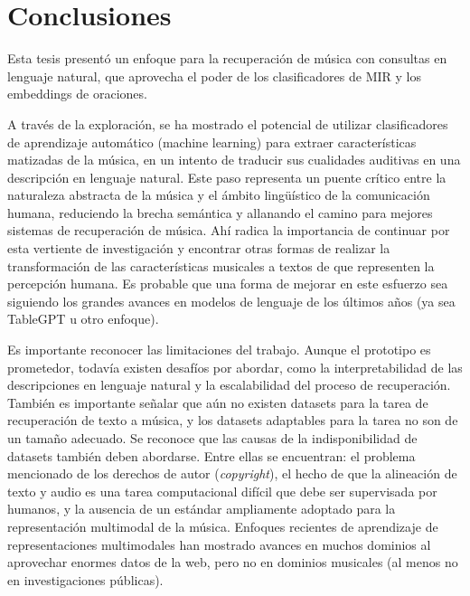 \chapter*{Conclusiones}
\label{chap:conclusions}
Esta tesis presentó un enfoque para la recuperación de música con consultas en lenguaje natural, que aprovecha el poder de los clasificadores de MIR y los embeddings de oraciones.

A través de la exploración, se ha mostrado el potencial de utilizar clasificadores de aprendizaje automático (machine learning) para extraer características matizadas de la música, en un intento de traducir sus cualidades auditivas en una descripción en lenguaje natural. Este paso representa un puente crítico entre la naturaleza abstracta de la música y el ámbito lingüístico de la comunicación humana, reduciendo la brecha semántica y allanando el camino para mejores sistemas de recuperación de música. Ahí radica la importancia de continuar por esta vertiente de investigación y encontrar otras formas de realizar la transformación de las características musicales a textos de que representen la percepción humana. Es probable que una forma de mejorar en este esfuerzo sea siguiendo los grandes avances en modelos de lenguaje de los últimos años (ya sea TableGPT u otro enfoque).


Es importante reconocer las limitaciones del trabajo. Aunque el prototipo es prometedor, todavía existen desafíos por abordar, como la interpretabilidad de las descripciones en lenguaje natural y la escalabilidad del proceso de recuperación. También es importante señalar que aún no existen datasets para la tarea de recuperación de texto a música, y los datasets adaptables para la tarea no son de un tamaño adecuado. 
Se reconoce que las causas de la indisponibilidad de datasets también deben abordarse. Entre ellas se encuentran: el problema mencionado de los derechos de autor (\textit{copyright}), el hecho de que la alineación de texto y audio es una tarea computacional difícil que debe ser supervisada por humanos, y la ausencia de un estándar ampliamente adoptado para la representación multimodal de la música. Enfoques recientes de aprendizaje de representaciones multimodales han mostrado avances en muchos dominios al aprovechar enormes datos de la web, pero no en dominios musicales (al menos no en investigaciones públicas).

